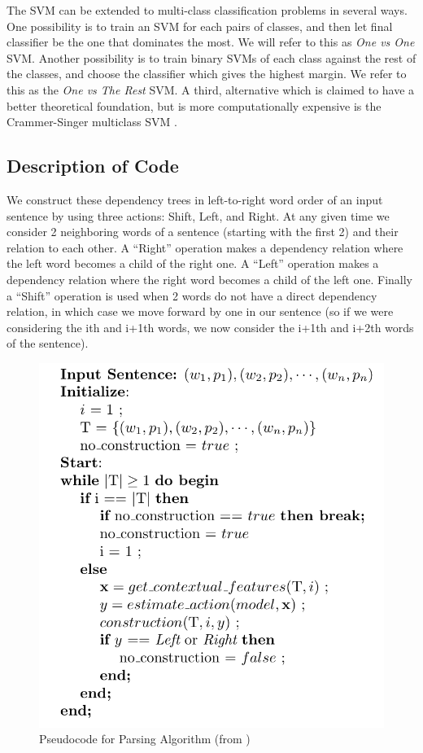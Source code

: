 \documentclass[12pt]{amsart}
\begin{document}
The SVM can be extended to multi-class classification problems in several ways. One possibility is to train an SVM for each pairs of classes, and then let final classifier be the one that dominates the most. We will refer to this as \emph{One vs One} SVM. Another possibility is to train binary SVMs of each class against the rest of the classes, and choose the classifier which gives the highest margin. We refer to this as the \emph{One vs The Rest} SVM. A third, alternative which is claimed to have a better theoretical foundation, but is more computationally expensive is the Crammer-Singer multiclass SVM \cite{crammer2002algorithmic}.

\subsection{Description of Code}
We construct these dependency trees in left-to-right word order of an input sentence
by using three actions: Shift, Left, and Right. At any given time we consider 2 neighboring words
of a sentence (starting with the first 2) and their relation to each other. A ``Right''
operation makes a dependency relation where the left word becomes a child of 
the right one. A ``Left'' operation makes a dependency relation where the right word
becomes a child of the left one. Finally a ``Shift'' operation is used when 2 words
do not have a direct dependency relation, in which case we move forward by one in our
sentence (so if we were considering the ith and i+1th words, we now consider the i+1th
and i+2th words of the sentence). 

\begin{figure}
\label{pseudocode}
\caption{Pseudocode for Parsing Algorithm (from \cite{yamada2003statistical})}
\center
\includegraphics[scale=.75]{pseudocode.png}
\end{figure}
\end{document}
